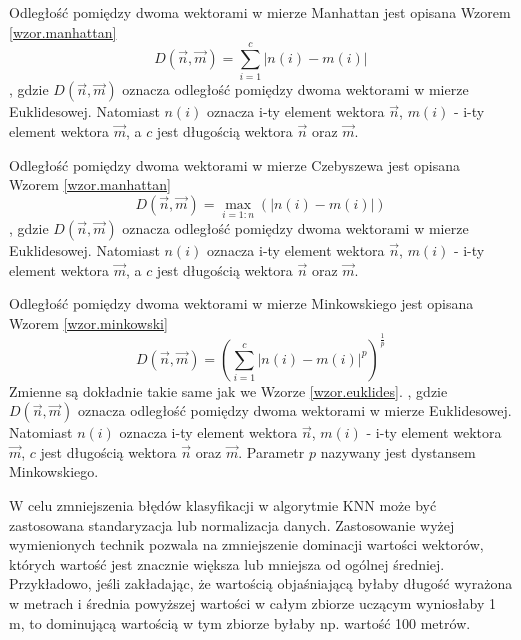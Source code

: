 \documentclass[a4paper,twoside,12pt]{book}
\begin{document}
    Odległość pomiędzy dwoma wektorami w mierze Manhattan jest opisana Wzorem \ref{wzor.manhattan}
    \large
    \begin{equation}
        D(\overrightarrow{n},\overrightarrow{m})=\sum_{i=1}^{c}\left |n(i)-m(i)\right |
        \label{wzor.manhattan}
    \end{equation}
    \normalsize
    , gdzie $D(\overrightarrow{n},\overrightarrow{m})$ oznacza odległość pomiędzy dwoma wektorami w mierze Euklidesowej.
    Natomiast $n(i)$ oznacza i-ty element wektora $\overrightarrow{n}$,  $m(i)$ - i-ty element wektora
    $\overrightarrow{m}$, a $c$ jest długością wektora  $\overrightarrow{n}$ oraz $\overrightarrow{m}$.

    Odległość pomiędzy dwoma wektorami w mierze Czebyszewa jest opisana Wzorem \ref{wzor.manhattan}
    \large
    \begin{equation}
        D(\overrightarrow{n},\overrightarrow{m})=\max_{i=1:n}( \left |n(i)-m(i) \right |)
        \label{wzor.czebyszew}
    \end{equation}
    \normalsize
    , gdzie $D(\overrightarrow{n},\overrightarrow{m})$ oznacza odległość pomiędzy dwoma wektorami w mierze Euklidesowej.
    Natomiast $n(i)$ oznacza i-ty element wektora $\overrightarrow{n}$,  $m(i)$ - i-ty element wektora
    $\overrightarrow{m}$, a $c$ jest długością wektora  $\overrightarrow{n}$ oraz $\overrightarrow{m}$.

    Odległość pomiędzy dwoma wektorami w mierze Minkowskiego jest opisana Wzorem \ref{wzor.minkowski}
    \large
    \begin{equation}
        D(\overrightarrow{n},\overrightarrow{m})=(\sum_{i=1}^{c} \left |n(i)-m(i) \right |^{p})^{\frac{1}{p}}
        \label{wzor.minkowski}
    \end{equation}
    \normalsize
    Zmienne są dokładnie takie same jak we Wzorze \ref{wzor.euklides}.
    , gdzie $D(\overrightarrow{n},\overrightarrow{m})$ oznacza odległość pomiędzy dwoma wektorami w mierze Euklidesowej.
    Natomiast $n(i)$ oznacza i-ty element wektora $\overrightarrow{n}$,  $m(i)$ - i-ty element wektora
    $\overrightarrow{m}$, $c$ jest długością wektora $\overrightarrow{n}$ oraz $\overrightarrow{m}$.
    Parametr $p$ nazywany jest dystansem Minkowskiego.

    W celu zmniejszenia błędów klasyfikacji w algorytmie KNN może być zastosowana standaryzacja lub normalizacja danych.
    Zastosowanie wyżej wymienionych technik pozwala na zmniejszenie dominacji wartości wektorów, których wartość jest
    znacznie większa lub mniejsza od ogólnej średniej. Przykładowo, jeśli zakładając, że
    wartością objaśniającą byłaby długość wyrażona w metrach i średnia powyższej wartości w całym zbiorze uczącym
    wyniosłaby 1 m,
    to dominującą wartością w tym zbiorze byłaby np. wartość 100 metrów.
\end{document}
